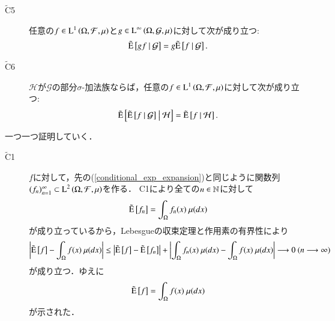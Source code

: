 \begin{prf}
\begin{description}
			\item[$\tilde{\mathrm{C}}$5]	任意の$f \in \operatorname{L}^{1} \left(\Omega, \mathcal{F},\mu\right)$と$g \in \operatorname{L}^{\infty} \left(\Omega, \mathcal{G},\mu\right)$に対して次が成り立つ:
				\begin{align}
					\tilde{\operatorname{E}} \left[ gf \ \middle|\ \mathcal{G} \right] = g\tilde{\operatorname{E}} \left[ f \ \middle|\ \mathcal{G} \right].
				\end{align}
			
			\item[$\tilde{\mathrm{C}}$6]	$\mathcal{H}$が$\mathcal{G}$の部分$\sigma$-加法族ならば，任意の$f \in \operatorname{L}^{1} \left(\Omega, \mathcal{F},\mu\right)$に対して次が成り立つ:
				\begin{align}
					\tilde{\operatorname{E}} \left[ \tilde{\operatorname{E}} \left[ f \ \middle|\ \mathcal{G} \right] \ \middle|\ \mathcal{H} \right] = \tilde{\operatorname{E}} \left[ f \ \middle|\ \mathcal{H} \right].
				\end{align}
		\end{description}
		一つ一つ証明していく．
		\begin{description}
			\item[$\tilde{\mathrm{C}}$1]
				$f$に対して，先の(\ref{conditional_exp_expansion})と同じように関数列$(f_n)_{n=1}^{\infty} \subset \operatorname{L}^{2} \left(\Omega,\mathcal{F},\mu\right)$を作る．
				C1により全ての$n \in \mathbb{N}$に対して
				\begin{align}
					\tilde{\operatorname{E}} \left[ f_n \right] = \int_{\Omega} f_n(x)\ \mu(dx)
				\end{align}
				が成り立っているから，Lebesgueの収束定理と作用素の有界性により
				\begin{align}
					\left| \tilde{\operatorname{E}} \left[ f \right] - \int_{\Omega} f(x)\ \mu(dx) \right|
					\leq \left| \tilde{\operatorname{E}} \left[ f \right] - \tilde{\operatorname{E}} \left[ f_n \right] \right| + \left| \int_{\Omega} f_n(x)\ \mu(dx) - \int_{\Omega} f(x)\ \mu(dx) \right|
					\longrightarrow 0\ (n \longrightarrow \infty)
				\end{align}
				が成り立つ．ゆえに
				\begin{align}
					\tilde{\operatorname{E}} \left[ f \right] = \int_{\Omega} f(x)\ \mu(dx)
				\end{align}
				が示された．
				

\end{description}
\end{prf}
